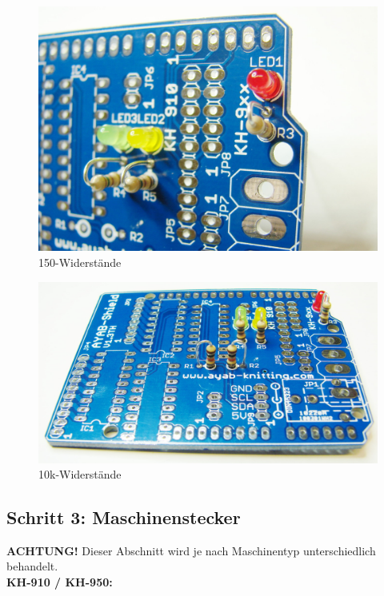 \documentclass[fleqn,10pt]{SelfArx} %
\begin{document}
\begin{figure}[tbhp]\centering
\includegraphics[width=\linewidth]{abb2_2}
\caption{150\textOmega-Widerstände}
\label{fig:abb2_2}
\end{figure}

\begin{figure}[tbhp]\centering
\includegraphics[width=\linewidth]{abb2_3}
\caption{10k\textOmega-Widerstände}
\label{fig:abb2_3}
\end{figure}

\FloatBarrier

 \subsection*{Schritt 3: Maschinenstecker}

\textbf{ACHTUNG!} Dieser Abschnitt wird je nach Maschinentyp unterschiedlich behandelt.\\

\textbf{KH-910 / KH-950:} \\
\end{document}
